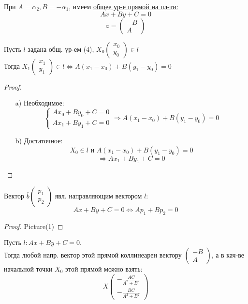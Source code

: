 При $A = \alpha_2, B = -\alpha_1$, имеем \underline{общее ур-е прямой на пл-ти:}
\begin{equation}
Ax + By + C = 0
\end{equation}
\[
\overline{a} = \begin{pmatrix}-B \\ A \end{pmatrix}
\]
\begin{statement}
Пусть $l$ задана общ. ур-ем (4), $X_0 \begin{pmatrix}x_0 \\ y_0 \end{pmatrix} \in l$ \\
Тогда $X_1 \begin{pmatrix}x_1 \\ y_1 \end{pmatrix} \in l \iff A(x_1 - x_0) + B(y_1 - y_0) = 0$
\end{statement}
\begin{proof}
 \begin{itemize}
   \item [a)] Необходимое:
     \begin{equation*}
       \begin{cases}
     Ax_0 + By_0 + C = 0 \\
     Ax_1 + By_1 + C = 0 
       \end{cases} \Rightarrow A(x_1 - x_0) + B(y_1 - y_0) = 0
     \end{equation*}
   \item [b) ] Достаточное:
     \[
     X_0 \in l \text{ и } A(x_1 - x_0) + B(y_1 - y_0) = 0
     \]
     \[
     \Rightarrow Ax_1 + By_1 + C = 0
     \]
 \end{itemize}
\end{proof}
\begin{consequence}
Вектор $\overline{b} \begin{pmatrix}p_1 \\ p_2 \end{pmatrix}$ явл. направляющим вектором $l\colon$
\[
Ax + By + C = 0 \iff Ap_1 + Bp_2 = 0
\]
\end{consequence}
\begin{proof}
Picture(1)
\end{proof}
\begin{theorem}
Пусть $l\colon Ax + By + C = 0$. \\
Тогда любой напр. вектор этой прямой коллинеарен вектору $\begin{pmatrix}-B \\ A \end{pmatrix}$, а в кач-ве начальной точки $X_0$ этой прямой можно взять:
\[
X \begin{pmatrix}-\frac{AC}{A^{2} + B^{2}} \\ -\frac{BC}{A^{2} + B^{2}} \end{pmatrix}
\]
\end{theorem}
